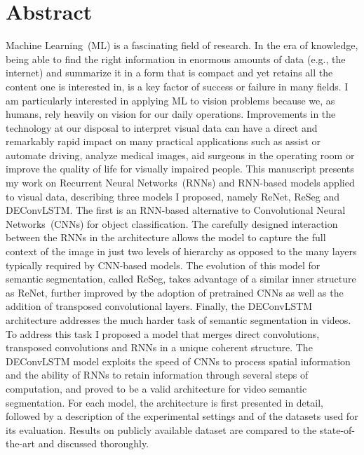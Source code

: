 \chapter*{Abstract}
Machine Learning~(ML) is a fascinating field of research. In the era of
knowledge, being able to find the right information in enormous amounts of data
(e.g., the internet) and summarize it in a form that is compact and yet retains
all the content one is interested in, is a key factor of success or failure in
many fields. I am particularly interested in applying ML to vision problems
because we, as humans, rely heavily on vision for our daily operations.
Improvements in the technology at our disposal to interpret visual data can
have a direct and remarkably rapid impact on many practical applications such
as assist or automate driving, analyze medical images, aid surgeons in the
operating room or improve the quality of life for visually impaired people.
This manuscript presents my work on Recurrent Neural Networks~(RNNs) and
RNN-based models applied to visual data, describing three models I proposed,
namely ReNet, ReSeg and DEConvLSTM. The first is an RNN-based alternative to
Convolutional Neural Networks~(CNNs) for object classification. The carefully
designed interaction between the RNNs in the architecture allows the model to
capture the full context of the image in just two levels of hierarchy as
opposed to the many layers typically required by CNN-based models. The
evolution of this model for semantic segmentation, called ReSeg, takes
advantage of a similar inner structure as ReNet, further improved by the
adoption of pretrained CNNs as well as the addition of transposed convolutional
layers. Finally, the DEConvLSTM architecture addresses the much harder task of
semantic segmentation in videos.  To address this task I proposed a model that
merges direct convolutions, transposed convolutions and RNNs in a unique
coherent structure. The DEConvLSTM model exploits the speed of CNNs to process
spatial information and the ability of RNNs to retain information through
several steps of computation, and proved to be a valid architecture for video
semantic segmentation. For each model, the architecture is first presented in
detail, followed by a description of the experimental settings and of the
datasets used for its evaluation. Results on publicly available dataset are
compared to the state-of-the-art and discussed thoroughly.
